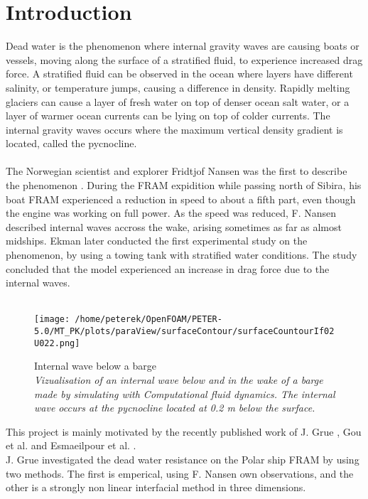 \documentclass[a4paper, 12pt]{report}
\begin{document}
\chapter{Introduction}
Dead water is the phenomenon where internal gravity waves are causing boats or vessels, moving along the surface of a stratified fluid, to experience increased drag force. A stratified fluid can be observed in the ocean where layers have different salinity, or temperature jumps, causing a difference in density. Rapidly melting glaciers can cause a layer of fresh water on top of denser ocean salt water, or a layer of warmer ocean currents can be lying on top of colder currents. The internal gravity waves occurs where the maximum vertical density gradient is located, called the pycnocline.\\
\\
The Norwegian scientist and explorer Fridtjof Nansen was the first to describe the phenomenon \citep{Nansen}. During the FRAM expidition while passing north of Sibira, his boat FRAM experienced a reduction in speed to about a fifth part, even though the engine was working on full power. As the speed was reduced, F. Nansen described internal waves accross the wake, arising sometimes as far as almost midships. Ekman later conducted the first experimental study on the phenomenon\cite{Ekman}, by using a towing tank with stratified water conditions. The study concluded that the model experienced an increase in drag force due to the internal waves.\\
\\
\begin{figure}[H]
	\centering
	\texttt{[image: /home/peterek/OpenFOAM/PETER-5.0/MT\_PK/plots/paraView/surfaceContour/surfaceCountourIf02U022.png]}
	\caption{Internal wave below a barge\\ \textit{Vizualisation of an internal wave below and in the wake of a barge made by simulating with Computational fluid dynamics. The internal wave occurs at the pycnocline located at 0.2 m below the surface.}}
	\label{fig:eta0}
\end{figure}
This project is mainly motivated by the recently published work of J. Grue \cite{Grue}, Gou et al. \cite{Gou} and Esmaeilpour et al. \cite{Esmaeilpour}.\\
J. Grue investigated the dead water resistance on the Polar ship FRAM by using two methods. The first is emperical, using F. Nansen own observations, and the other is a strongly non linear interfacial method in three dimensions.\\
\end{document}
